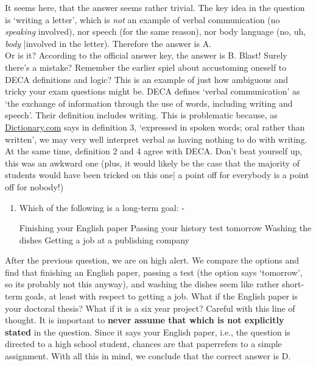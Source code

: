 \documentclass[12pt]{article}
\newcounter{choice}
\renewcommand\thechoice{\Alph{choice}}
\newcommand\choicelabel{\thechoice.}
\newenvironment{choices}%
  {\list{\choicelabel}%
     {\usecounter{choice}\def\makelabel##1{\hss\llap{##1}}%
       \settowidth{\leftmargin}{W.\hskip\labelsep\hskip 2.5em}%
       \def\choice{%
         \item
       } %
       \labelwidth\leftmargin\advance\labelwidth-\labelsep
       \topsep=0pt
       \partopsep=0pt
     }%
  }%
  {\endlist}
\begin{document}
It seems here, that the answer seems rather trivial. The key idea in the question is \lq writing a letter', which is \textit{not} an example of verbal communication (no \textit{speaking }involved), nor speech (for the same reason), nor body language (no, uh, \textit{body} |involved in the letter).  Therefore the answer is A.  \\

Or is it? According to the official answer key, the answer is B. Blast! Surely there's a mistake? Remember the earlier spiel about accustoming oneself to DECA definitions and logic? This is an example of just how ambiguous and tricky your exam questions might be. DECA defines \lq verbal communication' as \lq the exchange of information through the use of words, including writing and speech'. Their definition includes writing. This is problematic because, as \href{http://www.dictionary.com/browse/verbal}{Dictionary.com} says in definition 3, \lq expressed in spoken words; oral rather than written', we may very well interpret verbal as having nothing to do with writing. At the same time, definition 2 and 4 agree with DECA. Don't beat yourself up, this was an awkward one (plus, it would likely be the case that the majority of students would have been tricked on this one| a point off for everybody is a point off for nobody!)

\begin{enumerate}[resume]
	\item Which of the following is a long-term goal:
		\begin{choices}
			\choice Finishing your English paper
			\choice Passing your history test tomorrow
			\choice Washing the dishes
			\choice Getting a job at a publishing company
		\end{choices}
\end{enumerate}

	After the previous question, we are on high alert. We compare the options and find that finishing an English paper, passing a test (the option says \lq tomorrow', so its probably not this anyway), and washing the dishes seem like rather short-term goals, at least with respect to getting a job. What if the English paper is your doctoral thesis? What if it is a six year project? Careful with this line of thought. It is important to \textbf{never assume that which is not explicitly stated} in the question. Since it says \ldq your English paper\rdq, i.e., the question is directed to a high school student, chances are that \ldq paper\rdq refers to a simple assignment. With all this in mind, we conclude that the correct answer is D. \\
	
\end{document}
